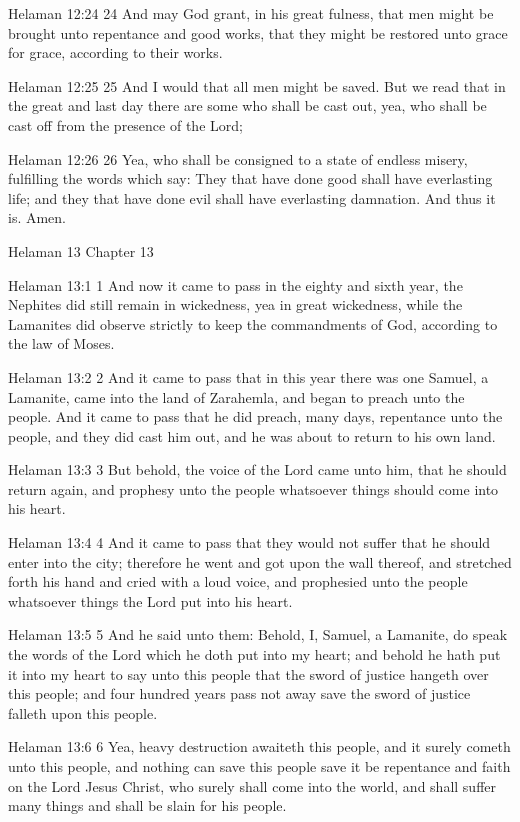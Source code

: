 Helaman 12:24
 24 And may God grant, in his great fulness, that men might be
brought unto repentance and good works, that they might be
restored unto grace for grace, according to their works.

Helaman 12:25
 25 And I would that all men might be saved. But we read that in
the great and last day there are some who shall be cast out, yea,
who shall be cast off from the presence of the Lord;

Helaman 12:26
 26 Yea, who shall be consigned to a state of endless misery,
fulfilling the words which say: They that have done good shall
have everlasting life; and they that have done evil shall have
everlasting damnation. And thus it is. Amen.

Helaman 13
Chapter 13

Helaman 13:1
 1 And now it came to pass in the eighty and sixth year, the
Nephites did still remain in wickedness, yea in great wickedness,
while the Lamanites did observe strictly to keep the commandments
of God, according to the law of Moses.

Helaman 13:2
 2 And it came to pass that in this year there was one Samuel, a
Lamanite, came into the land of Zarahemla, and began to preach
unto the people. And it came to pass that he did preach, many
days, repentance unto the people, and they did cast him out, and
he was about to return to his own land.

Helaman 13:3
 3 But behold, the voice of the Lord came unto him, that he
should return again, and prophesy unto the people whatsoever
things should come into his heart.

Helaman 13:4
 4 And it came to pass that they would not suffer that he should
enter into the city; therefore he went and got upon the wall
thereof, and stretched forth his hand and cried with a loud
voice, and prophesied unto the people whatsoever things the Lord
put into his heart.

Helaman 13:5
 5 And he said unto them: Behold, I, Samuel, a Lamanite, do speak
the words of the Lord which he doth put into my heart; and behold
he hath put it into my heart to say unto this people that the
sword of justice hangeth over this people; and four hundred years
pass not away save the sword of justice falleth upon this people.

Helaman 13:6
 6 Yea, heavy destruction awaiteth this people, and it surely
cometh unto this people, and nothing can save this people save it
be repentance and faith on the Lord Jesus Christ, who surely
shall come into the world, and shall suffer many things and shall
be slain for his people.

